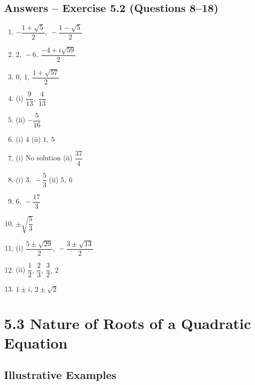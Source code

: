 \documentclass[12pt,a4paper]{article}
\begin{document}
\subsection{Answers -- Exercise 5.2 (Questions 8--18)}

\begin{enumerate}[start=8]
    \item \( -\dfrac{1+\sqrt{5}}{2},\ -\dfrac{1-\sqrt{5}}{2} \)
    \item \( 2,\ -6,\ \dfrac{-4 + i\sqrt{59}}{2} \)
    \item \( 0,\ 1,\ \dfrac{1 + \sqrt{57}}{2} \)
    \item (i) \( \dfrac{9}{13},\ \dfrac{4}{13} \)
    \item (ii) \( -\dfrac{5}{16} \)
    \item (i) \( 4 \) \quad (ii) \( 1,\ 5 \)
    \item (i) No solution \quad (ii) \( \dfrac{37}{4} \)
    \item (i) \( 3,\ -\dfrac{5}{3} \) \quad (ii) \( 5,\ 6 \)
    \item \( 6,\ -\dfrac{17}{3} \)
    \item \( \pm\sqrt{\dfrac{5}{3}} \)
    \item (i) \( \dfrac{5 \pm \sqrt{29}}{2},\ -\dfrac{3 \pm \sqrt{13}}{2} \)
    \item (ii) \( \dfrac{1}{2},\ \dfrac{2}{3},\ \dfrac{3}{2},\ 2 \)
    \item \( 1 \pm i,\ 2 \pm \sqrt{2} \)
\end{enumerate}

\section{5.3 Nature of Roots of a Quadratic Equation}

\subsection{Illustrative Examples}
\end{document}

